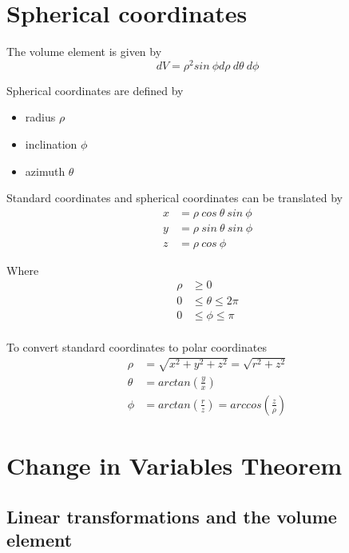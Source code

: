 \section{Spherical coordinates}
\begin{framed}

   The volume element is given by
   \[
     dV = \rho^2 sin\ \phi d \rho\ d \theta\ d \phi
   \]  


   Spherical coordinates are defined by 
   \begin{itemize}
      \item radius $\rho$ 
      \item inclination $\phi$ 
      \item azimuth $\theta$ 
   \end{itemize}

   Standard coordinates and spherical coordinates can be translated by
   \begin{align*}
      x &= \rho\ cos\ \theta\ sin\ \phi \\
      y &= \rho\ sin\ \theta\ sin\ \phi \\
      z &= \rho\ cos\ \phi
   \end{align*}

   Where 
   \begin{align*}
      \rho & \geq 0 \\
      0  & \leq \theta  \leq 2 \pi \\
      0  & \leq \phi  \leq \pi \\
   \end{align*}

   To convert standard coordinates to polar coordinates
   \begin{align*}
      \rho &= \sqrt{x^2 + y^2 + z^2}  = \sqrt{r^2 + z^2}\\
      \theta &= arctan( \frac{y}{x}) \\
      \phi &= arctan \left( \frac{r}{z} \right) = arccos \left( \frac{z}{\rho } \right) 
   \end{align*}
\end{framed}

\section{Change in Variables Theorem}

\subsection{Linear transformations and the volume element}

